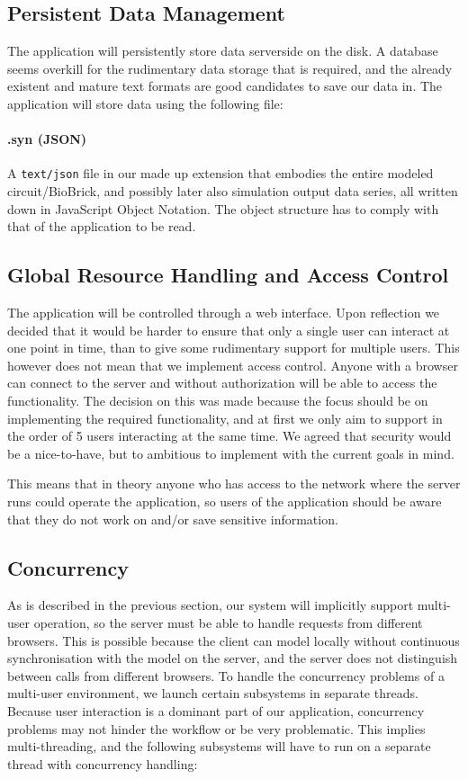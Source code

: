 \subsection{Persistent Data Management}
\label{ss-persitance}
The application will persistently store data serverside on the disk. A database seems overkill for the rudimentary data storage that is required, and the already existent and mature text formats are good candidates to save our data in. The application will store data using the following file:

\paragraph{.syn (JSON)}
A \verb=text/json= file in our made up extension
that embodies the entire modeled circuit/BioBrick, and possibly later also simulation output data series, all written down in JavaScript Object Notation. The object structure has to comply with that of the application to be read.


\subsection{Global Resource Handling and Access Control}
The application will be controlled through a web interface. Upon reflection we decided that it would be harder to ensure that only a single user can interact at one point in time, than to give some rudimentary support for multiple users. This however does not mean that we implement access control. Anyone with a browser can connect to the server and without authorization will be able to access the functionality. The decision on this was made because the focus should be on implementing the required functionality, and at first we only aim to support in the order of 5 users interacting at the same time. We agreed that security  would be a nice-to-have, but to ambitious to implement with the current goals in mind.

This means that in theory anyone who has access to the network where the server runs could operate the application, so users of the application should be aware that they do not work on and/or save sensitive information.

\pagebreak
\subsection{Concurrency}
As is described in the previous section, our system will implicitly support multi-user operation, so the server must be able to handle requests from different browsers. This is possible because the client can model locally without continuous synchronisation with the model on the server, and the server does not distinguish between calls from different browsers. To handle the concurrency problems of a multi-user environment, we launch certain subsystems in separate threads. Because user interaction is a dominant part of our application, concurrency problems may not hinder the workflow or be very problematic. This implies multi-threading, and the following subsystems will have to run on a separate thread with concurrency handling:

